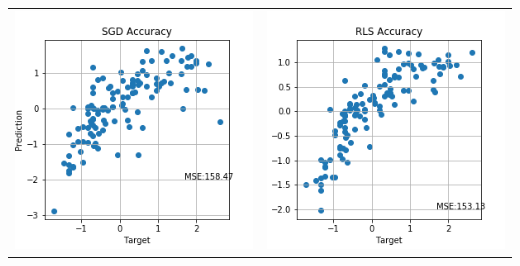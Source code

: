 \documentclass{article}
\begin{document}
\begin{table}[H]
\begin{center}
\begin{tabular}{cc}
\includegraphics[scale=0.5]{MPG-SGD-ACC.png} &
\includegraphics[scale=0.5]{MPG-RLS-ACC.png}
\end{tabular}
\end{center}
\end{table}
\end{document}

